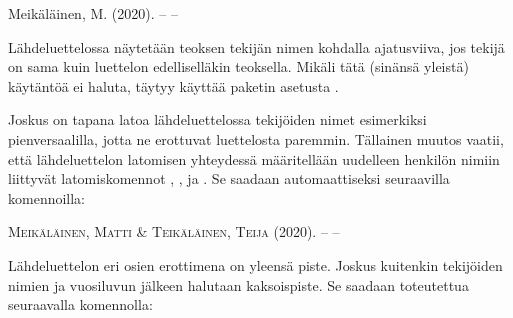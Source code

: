 \begin{koodilohkosis}
\usepackage[…, giveninits]{biblatex}
\end{koodilohkosis}

\begin{tulossis}
  Meikäläinen, M. (2020). -- --
\end{tulossis}

\noindent
Lähdeluettelossa näytetään teoksen tekijän nimen kohdalla ajatusviiva,
jos tekijä on sama kuin luettelon edelliselläkin teoksella. Mikäli tätä
(sinänsä yleistä) käytäntöä ei haluta, täytyy käyttää paketin asetusta
.

\begin{koodilohkosis}
\usepackage[…, dashed=false]{biblatex}
\end{koodilohkosis}

\noindent
Joskus on tapana latoa lähdeluettelossa tekijöiden nimet esimerkiksi
pienversaalilla, jotta ne erottuvat luettelosta paremmin. Tällainen
muutos vaatii, että lähdeluettelon latomisen yhteydessä määritellään
uudelleen henkilön nimiin liittyvät latomiskomennot
, ,
 ja . Se saadaan
automaattiseksi seuraavilla komennoilla:

\begin{koodilohkosis}
\end{koodilohkosis}

\begin{tulossis}
  \textsc{Meikäläinen}, \textsc{Matti} \& \textsc{Teikäläinen},
  \textsc{Teija} (2020). -- --
\end{tulossis}

\noindent
Lähdeluettelon eri osien erottimena on yleensä piste. Joskus kuitenkin
tekijöiden nimien ja vuosiluvun jälkeen halutaan kaksoispiste. Se
saadaan toteutettua seuraavalla komennolla:

\begin{koodilohkosis}
\end{koodilohkosis}

